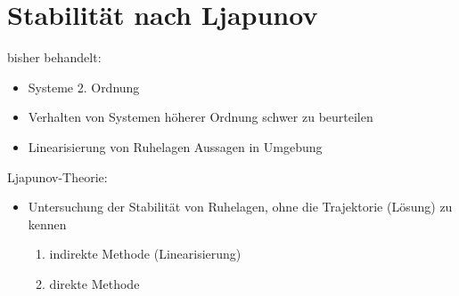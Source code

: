 \documentclass[ngerman]{tudscrreprt}
\begin{document}
\chapter{Stabilität nach Ljapunov}
bisher behandelt:
\begin{itemize}
\item Systeme 2. Ordnung
\item Verhalten von Systemen höherer Ordnung schwer zu beurteilen
\item Linearisierung von Ruhelagen Aussagen in Umgebung
\end{itemize}
Ljapunov-Theorie:
\begin{itemize}
\item Untersuchung der Stabilität von Ruhelagen, ohne die Trajektorie (Lösung) zu kennen
\begin{enumerate}
\item indirekte Methode (Linearisierung)
\item direkte Methode
\end{enumerate}
\end{itemize}
\end{document}
